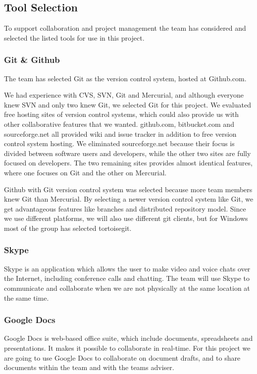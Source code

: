 \subsection{Tool Selection}
To support collaboration and project management the team has considered and
selected the listed tools for use in this project.

\subsubsection{Git \& Github}
The team has selected Git as the version control system, hosted at
Github.com.

We had experience with CVS, SVN, Git and Mercurial, and although everyone 
knew SVN and only two knew Git, we selected Git for this project. We 
evaluated free hosting sites of version control systems, which could also 
provide us with other collaborative features that we wanted. github.com, 
bitbucket.com and sourceforge.net all provided wiki and issue tracker in 
addition to free version control system hosting. We eliminated 
sourceforge.net because their focus is divided between software users and 
developers, while the other two sites are fully focused on developers. The 
two remaining sites provides almost identical features, where one focuses on 
Git and the other on Mercurial.

Github with Git version control system was selected because more team members
knew Git than Mercurial. By selecting a newer version control system like Git,
we get advantageous features like branches and distributed repository model.
Since we use different platforms, we will also use different git clients, but
for Windows most of the group has selected tortoisegit.

\subsubsection{Skype}
Skype is an application which allows the user to make video and voice chats
over the Internet, including conference calls and chatting. The team will use
Skype to communicate and collaborate when we are not physically at the same
location at the same time.

\subsubsection{Google Docs}
Google Docs is web-based office suite, which include documents, spreadsheets
and presentations. It makes it possible to collaborate in real-time. For this
project we are going to use Google Docs to collaborate on document drafts,
and to share documents within the team and with the teams adviser.

